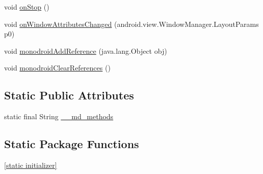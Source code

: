 \begin{CompactItemize}
\item 
void \hyperlink{classmd5b60ffeb829f638581ab2bb9b1a7f4f3f_1_1_forms_app_compat_activity_249966d126a906167db3ac7d026675c5}{onStop} ()
\item 
void \hyperlink{classmd5b60ffeb829f638581ab2bb9b1a7f4f3f_1_1_forms_app_compat_activity_94568ca372a2589ad853d67c5b1d1a71}{onWindowAttributesChanged} (android.view.WindowManager.LayoutParams p0)
\item 
void \hyperlink{classmd5b60ffeb829f638581ab2bb9b1a7f4f3f_1_1_forms_app_compat_activity_1389ec337c7200cacb878f5e3c5b946c}{monodroidAddReference} (java.lang.Object obj)
\item 
void \hyperlink{classmd5b60ffeb829f638581ab2bb9b1a7f4f3f_1_1_forms_app_compat_activity_8a2a2c0fe41e592284f243d8b007ecd0}{monodroidClearReferences} ()
\end{CompactItemize}
\subsection*{Static Public Attributes}
\begin{CompactItemize}
\item 
static final String \hyperlink{classmd5b60ffeb829f638581ab2bb9b1a7f4f3f_1_1_forms_app_compat_activity_2cb4fae3ad0f7b38c85c94c344df5089}{\_\-\_\-md\_\-methods}
\end{CompactItemize}
\subsection*{Static Package Functions}
\begin{CompactItemize}
\item 
\hyperlink{classmd5b60ffeb829f638581ab2bb9b1a7f4f3f_1_1_forms_app_compat_activity_6a161f889b5107b95ec5f85d90689265}{\mbox{[}static initializer\mbox{]}}
\end{CompactItemize}

